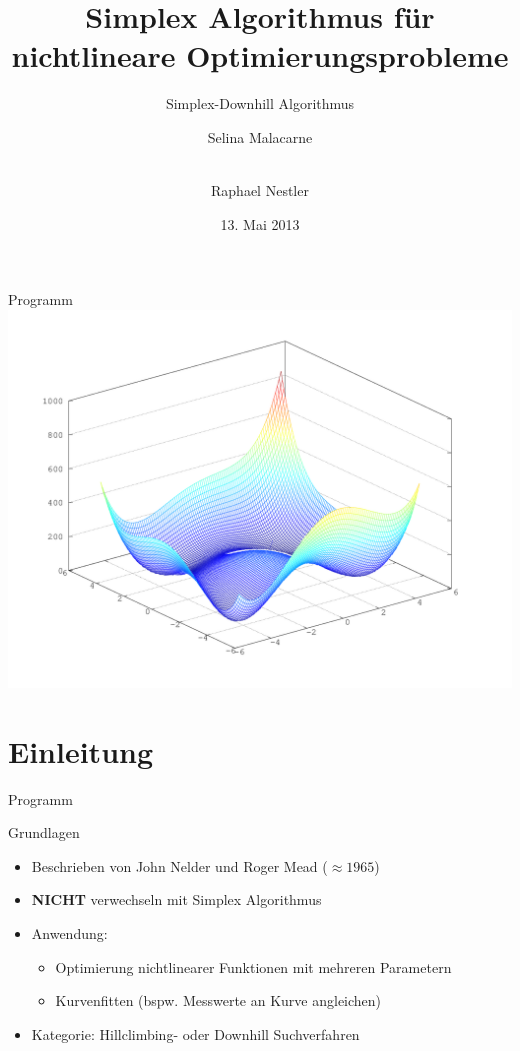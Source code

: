 \documentclass[\outputformat]{beamer}
\author{Selina Malacarne \and\\ Raphael Nestler}
\title{Simplex Algorithmus für nichtlineare Optimierungsprobleme}
\subtitle{Simplex-Downhill Algorithmus}
\date{13. Mai 2013}
\begin{document}
\begin{frame}
\titlepage
\end{frame}

\begin{frame}{Programm}
\tableofcontents
\includegraphics[height=0.5\paperheight]{himmelblau.png}
\end{frame}

\section{Einleitung} 
\begin{frame}{Programm}\tableofcontents[currentsection]\end{frame}

\begin{frame}{Grundlagen}
\begin{itemize}
	\item Beschrieben von John Nelder und Roger Mead ($\approx 1965$)
	\item \textbf{NICHT} verwechseln mit Simplex Algorithmus
	\item Anwendung: 
	\begin{itemize}
		\item Optimierung nichtlinearer Funktionen mit mehreren Parametern 
		\item Kurvenfitten (bspw. Messwerte an Kurve angleichen)
	\end{itemize}	
	\item Kategorie: Hillclimbing- oder Downhill Suchverfahren
\end{itemize}
\end{frame}
\end{document}
